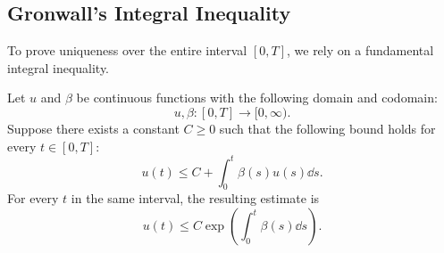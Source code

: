 \subsection{Gronwall's Integral Inequality}


To prove uniqueness over the entire interval $[0, T]$, we rely on a fundamental integral inequality.

\begin{lemma}
Let $u$ and $\beta$ be continuous functions with the following domain and codomain:
\[
u, \beta: [0, T] \to [0, \infty).
\]
Suppose there exists a constant $C \geq 0$ such that the following bound holds for every $t \in [0, T]$:
\begin{equation}
u(t) \leq C + \int_0^t \beta(s) u(s) \dd s.
\end{equation}
For every $t$ in the same interval, the resulting estimate is
\begin{equation}
u(t) \leq C \exp\left( \int_0^t \beta(s) \dd s\right).
\end{equation}

\end{lemma}

